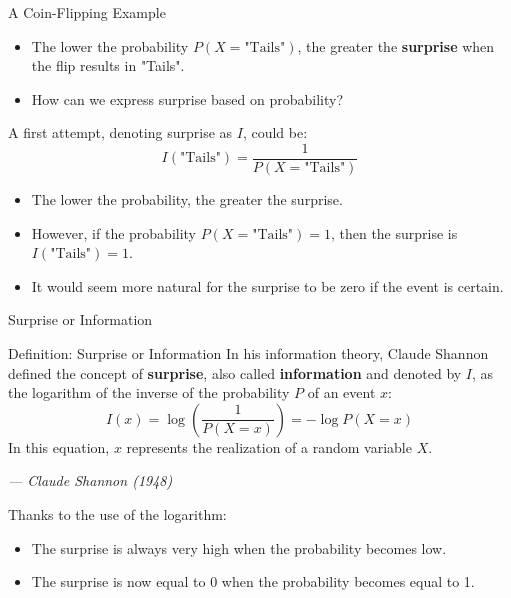 \begin{frame}{A Coin-Flipping Example}
	\begin{itemize}
		\item The lower the probability $P(X = \text{"Tails"})$, the greater the \textbf{surprise} when the flip results in "Tails".
		\pause
		\item How can we express surprise based on probability?
	\end{itemize}
	\pause
	A first attempt, denoting surprise as $I$, could be:
	\begin{equation*}
		I(\text{"Tails"}) = \frac{1}{P(X = \text{"Tails"})}
	\end{equation*}
	\pause
	\begin{itemize}
		\item The lower the probability, the greater the surprise.
		\pause
		\item However, if the probability $P(X = \text{"Tails"}) = 1$, then the surprise is $I(\text{"Tails"}) = 1$.
		\pause
		\item It would seem more natural for the surprise to be zero if the event is certain.
	\end{itemize}
\end{frame}

\begin{frame}{Surprise or Information}
	\begin{block}{Definition: Surprise or Information}
		In his information theory, Claude Shannon defined the concept of \textbf{surprise}, also called \textbf{information} and denoted by $I$, as the logarithm of the inverse of the probability $P$ of an event $x$:
		\begin{equation*}
			I(x) = \log{\left(\frac{1}{P(X = x)}\right)} = - \log{P(X = x)}
		\end{equation*}
		In this equation, $x$ represents the realization of a random variable $X$.
		
		\vspace{0.3cm}
		\hfill
		\textit{--- Claude Shannon (1948)}
	\end{block}
	\pause
	Thanks to the use of the logarithm:
	\begin{itemize}
		\item The surprise is always very high when the probability becomes low.
		\item The surprise is now equal to 0 when the probability becomes equal to 1.
	\end{itemize}
\end{frame}


